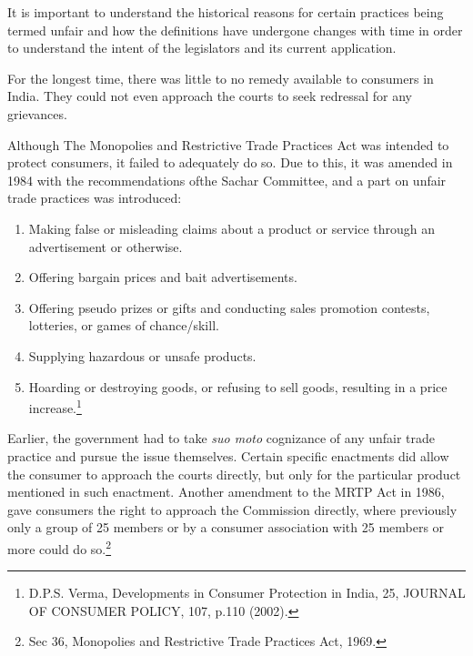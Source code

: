 \begin{multicols}{2}
\vspace{-.15cm}


\vspace{-.15cm}

\noi
It is important to understand the historical reasons for certain practices being termed unfair and
how the definitions have undergone changes with time in order to understand the intent of the
legislators and its current application.

\noi
For the longest time, there was little to no remedy available to consumers in India. They could
not even approach the courts to seek redressal for any grievances.

\noi
Although The Monopolies and Restrictive Trade Practices Act was intended to protect
consumers, it failed to adequately do so. Due to this, it was amended in 1984 with the
recommendations ofthe Sachar Committee, and a part on unfair trade practices was introduced:

\vspace{-.4cm}

\begin{enumerate}
\itemsep=0pt

\item[1)] Making false or misleading claims about a product or service through an advertisement or otherwise.

\item[2)] Offering bargain prices and bait advertisements.

\item[3)] Offering pseudo prizes or gifts and conducting sales promotion contests, lotteries, or games of chance/skill.

\item[4)] Supplying hazardous or unsafe products.

\item[5)] Hoarding or destroying goods, or refusing to sell goods, resulting in a price increase.\footnote{D.P.S. Verma, Developments in Consumer Protection in India, 25, JOURNAL OF CONSUMER POLICY, 107, p.110 (2002).}
\end{enumerate}

\vspace{-.4cm}

\noi
Earlier, the government had to take \textit{suo moto} cognizance of any unfair trade practice and pursue
the issue themselves. Certain specific enactments did allow the consumer to approach the courts
directly, but only for the particular product mentioned in such enactment. Another amendment
to the MRTP Act in 1986, gave consumers the right to approach the Commission directly,
where previously only a group of 25 members or by a consumer association with 25 members
or more could do so.\footnote{Sec 36, Monopolies and Restrictive Trade Practices Act, 1969.}


\end{multicols}
